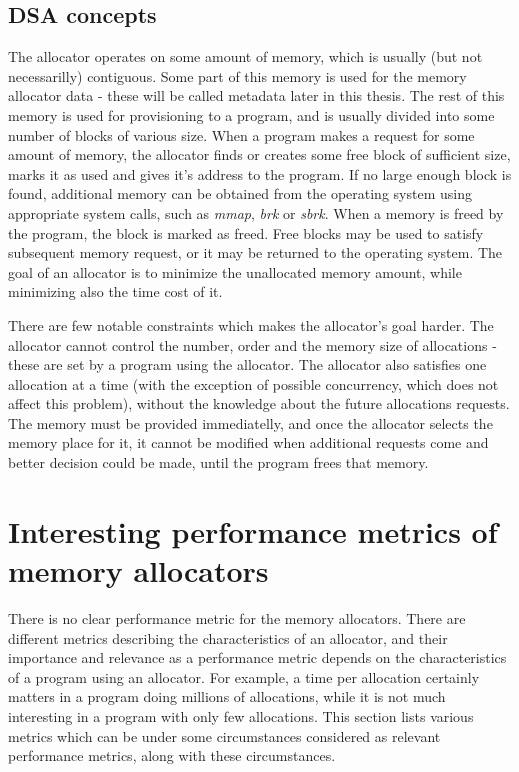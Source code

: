 \subsection{DSA concepts}
The allocator operates on some amount of memory, which is usually (but not necessarilly) contiguous. Some part of this memory is used for the memory allocator data - these will be called metadata later in this thesis. The rest of this memory is used for provisioning to a program, and is usually divided into some number of blocks of various size. When a program makes a request for some amount of memory, the allocator finds or creates some free block of sufficient size, marks it as used and gives it's address to the program. If no large enough block is found, additional memory can be obtained from the operating system using appropriate system calls, such as {\em mmap}, {\em brk} or {\em sbrk}. When a memory is freed by the program, the block is marked as freed. Free blocks may be used to satisfy subsequent memory request, or it may be returned to the operating system. The goal of an allocator is to minimize the unallocated memory amount, while minimizing also the time cost of it.

There are few notable constraints which makes the allocator's goal harder. The allocator cannot control the number, order and the memory size of allocations - these are set by a program using the allocator. The allocator also satisfies one allocation at a time (with the exception of possible concurrency, which does not affect this problem), without the knowledge about the future allocations requests. The memory must be provided immediatelly, and once the allocator selects the memory place for it, it cannot be modified when additional requests come and better decision could be made, until the program frees that memory. 
\section{Interesting performance metrics of memory allocators}
There is no clear performance metric for the memory allocators. There are different metrics describing the characteristics of an allocator, and their importance and relevance as a performance metric depends on the characteristics of a program using an allocator. For example, a time per allocation certainly matters in a program doing millions of allocations, while it is not much interesting in a program with only few allocations. This section lists various metrics which can be under some circumstances considered as relevant performance metrics, along with these circumstances. 

